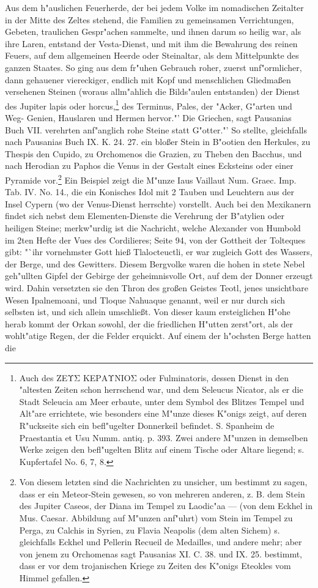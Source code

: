 \documentclass[a4paper, 11pt, oneside, polutonikogreek, german]{article}
\begin{document}
Aus dem h"auslichen Feuerherde, der bei jedem Volke im nomadischen Zeitalter in der Mitte des Zeltes stehend, die Familien zu gemeinsamen Verrichtungen, Gebeten, traulichen Gespr"achen sammelte, und ihnen darum so heilig war, als ihre Laren, entstand der Vesta-Dienst, und mit ihm die Bewahrung des reinen Feuers, auf dem allgemeinen Heerde oder Steinaltar, als dem Mittelpunkte des ganzen Staates. So ging aus dem fr"uhen Gebrauch roher, zuerst unf"ormlicher, dann gehauener viereckiger, endlich mit Kopf und menschlichen Gliedmaßen versehenen Steinen (woraus allm"ahlich die Bilds"aulen entstanden) der Dienst des Jupiter lapis oder horcus,\footnote{Auch des ΖΕΥΣ ΚΕΡΑΥNIOΣ oder Fulminatoris, dessen Dienst in den "altesten Zeiten schon herrschend war, und dem Seleucus Nicator, als er die Stadt Seleucia am Meer erbaute, unter dem Symbol des Blitzes Tempel und Alt"are errichtete, wie besonders eine M"unze dieses K"onigs zeigt, auf deren R"uckseite sich ein befl"ugelter Donnerkeil befindet. S. Spanheim de Praestantia et Usu Numm. antiq. p. 393. Zwei andere M"unzen in demselben Werke zeigen den befl"ugelten Blitz auf einem Tische oder Altare liegend; s. Kupfertafel No. 6, 7, 8.} des Terminus, Pales, der "Acker, G"arten und Weg- Genien, Hauslaren und Hermen hervor."' Die Griechen, sagt Pausanias Buch VII. verehrten anf"anglich rohe Steine statt G"otter."' So stellte, gleichfalls nach Pausanias Buch IX. K. 24. 27. ein bloßer Stein in B"ootien den Herkules, zu Thespis den Cupido, zu Orchomenos die Grazien, zu Theben den Bacchus, und nach Herodian zu Paphos die Venus in der Gestalt eines Ecksteins oder einer Pyramide vor.\footnote{Von diesem letzten sind die Nachrichten zu unsicher, um bestimmt zu sagen, dass er ein Meteor-Stein gewesen, so von mehreren anderen, z. B. dem Stein des Jupiter Caseos, der Diana im Tempel zu Laodic"aa --- (von dem Eckhel in Mus. Caesar. Abbildung auf M"unzen anf"uhrt) vom Stein im Tempel zu Perga, zu Calchis in Syrien, zu Flavia Neapolis (dem alten Sichem) s. gleichfalls Eckhel und Pellerin Recueil de Medailles, und andere mehr; aber von jenem zu Orchomenas sagt Pausanias XI. C. 38. und IX. 25. bestimmt, dass er vor dem trojanischen Kriege zu Zeiten des K"onigs Eteokles vom Himmel gefallen.} Ein Beispiel zeigt die M"unze Iaus Vaillaut Num. Graec. Imp. Tab. IV. No. 14., die ein Konisches Idol mit 2 Tauben und Leuchtern aus der Insel Cypern (wo der Venus-Dienst herrschte) vorstellt. Auch bei den Mexikanern findet sich nebst dem Elementen-Dienste die Verehrung der B"atylien oder heiligen Steine; merkw"urdig ist die Nachricht, welche Alexander von Humbold im 2ten Hefte der Vues des Cordilieres; Seite 94, von der Gottheit der Tolteques gibt: "`ihr vornehmster Gott hieß Tlalocteuctli, er war zugleich Gott des Wassers, der Berge, und des Gewitters. Diesem Bergvolke waren die hohen in stete Nebel geh"ullten Gipfel der Gebirge der geheimnisvolle Ort, auf dem der Donner erzeugt wird. Dahin versetzten sie den Thron des großen Geistes Teotl, jenes unsichtbare Wesen Ipalnemoani, und Tloque Nahuaque genannt, weil er nur durch sich selbsten ist, und sich allein umschließt. Von dieser kaum ersteiglichen H"ohe herab kommt der Orkan sowohl, der die friedlichen H"utten zerst"ort, als der wohlt"atige Regen, der die Felder erquickt. Auf einem der h"ochsten Berge hatten die 
\end{document}
